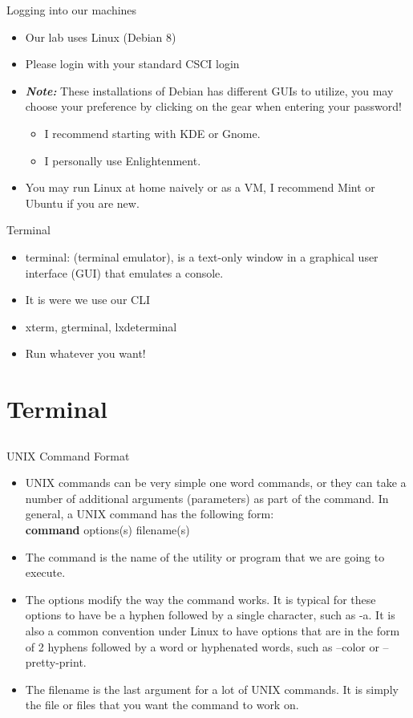 \documentclass{beamer}
\begin{document}
\begin{frame}{Logging into our machines}
\begin{itemize}
\item Our lab uses Linux (Debian 8)
\item Please login with your standard CSCI login
\item \textbf{\textit{Note:}} These installations of Debian has different GUIs to utilize, you may choose your preference by clicking on the gear when entering your password!
\begin{itemize}
\item I recommend starting with KDE or Gnome.
\item I personally use Enlightenment.
\end{itemize}
\item You may run Linux at home naively or as a VM, I recommend Mint or Ubuntu if you are new.
\end{itemize}
\end{frame}

\begin{frame}{Terminal}
\begin{itemize}
\item terminal: (terminal emulator), is a text-only window in a graphical user interface (GUI) that emulates a console. 
\item It is were we use our CLI
\item xterm, gterminal, lxdeterminal
\item Run whatever you want!
\end{itemize}
\end{frame}

\section{Terminal}
\subsection{}

\begin{frame}{UNIX Command Format}
\begin{itemize}
\item UNIX commands can be very simple one word commands, or they can take a number of additional arguments (parameters) as part of the command. In general, a UNIX command has the following form: \\
\textbf{command} options(s) filename(s)
\item The command is the name of the utility or program that we are going to execute. 
\item The options modify the way the command works. It is typical for these options to have be a hyphen followed by a single character, such as -a. It is also a common convention under Linux to have options that are in the form of 2 hyphens followed by a word or hyphenated words, such as --color or --pretty-print. 
\item The filename is the last argument for a lot of UNIX commands. It is simply the file or files that you want the command to work on.
\end{itemize}
\end{frame}
\end{document}
